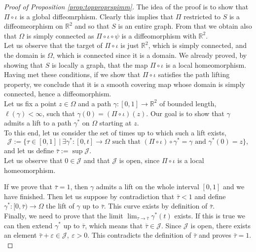 \documentclass[a4paper,11pt,openright,twoside]{book}
\renewcommand{\epsilon}{\varepsilon}
\renewcommand{\Omega}{\varOmega}
\newcommand{\R}{\mathbb{R}}
\newcommand{\1}{\mathds{1}}
\theoremstyle{plain}
\theoremstyle{definition}
\theoremstyle{remark}
\begin{document}
\begin{proof}[Proof of Proposition \ref{prop:topproprspimm}]
	The idea of the proof is to show that $\Pi\circ \iota$ is a global diffeomrphism. Clearly this implies that $\Pi$ restricted to $S$ is a diffeomeorphism on $\R^2$ and so that $S$ is an entire graph. From that we obtain also that $\Omega$ is simply connected as $\Pi\circ\iota\circ\psi$ is a diffeomorphism with $\R^2$.\\ 

	Let us observe that the target of $\Pi\circ \iota$ is just $\R^2$, which is simply connected, and the domain is $\Omega$, which is connected since it is a domain. We already proved, by showing that $S$ is locally a graph, that the map $\Pi \circ \iota $ is a local homeomorphism.\\
	Having met these conditions, if we show that $\Pi\circ \iota$ satisfies the path lifting property, we conclude that it is a smooth covering map whose domain is simply connected, hence a diffeomorphism.\\

	Let us fix a point $z\in \Omega$ and a path $\gamma:[0,1] \to \R^2$ of bounded length, $\ell(\gamma) < \infty$, such that $\gamma(0) = (\Pi\circ \iota)(z)$. Our goal is to show that $\gamma$ admits a lift to a path $\gamma^*$ on $\Omega$ starting at $z$.\\
	To this end, let us consider the set of times up to which such a lift exists,
	\[
		\mathcal{J}:= \{\tau\in [0,1]\ |\ \exists \gamma^*: [0,t] \to\Omega \text{ such that } (\Pi\circ\iota)\circ \gamma^* = \gamma \text{ and } \gamma^*(0)=z\},
	\]
	and let us define $\bar \tau := \sup \mathcal{J}$.\\

	Let us observe that $0\in \mathcal{J}$ and that $\mathcal{J}$ is open, since $\Pi \circ\iota$ is a local homeomorphism.

	If we prove that $\bar \tau = 1$, then $\gamma$ admits a lift on the whole interval $[0,1]$ and we have finished. Then let us suppose by contradiction that $\bar \tau<1$ and define $\gamma^* : [0,\bar \tau) \to \Omega$ the lift of $\gamma$ up to $\bar \tau$. This curve exists by definition of $\bar \tau$.\\

	
	Finally, we need to prove that the limit $\lim_{\tau \to \bar \tau} \gamma^*(t) $ exists. If this is true we can then extend $\gamma^*$ up to $\bar \tau$, which means that $\bar \tau\in \mathcal{J}$. Since $\mathcal{J}$ is open, there exists an element $\bar \tau +\epsilon \in \mathcal{J},\ \epsilon>0$. This contradicts the definition of $\bar \tau$ and proves $\bar \tau=1$.\\
	

\end{proof}
\end{document}
